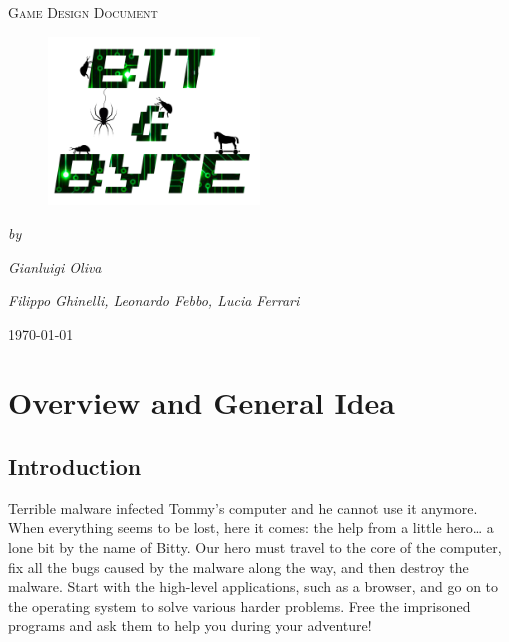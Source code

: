 \documentclass[12pt, a4paper]{report}
\begin{document}
\begin{titlepage}
	\centering
	\vspace{1cm}
	\vspace{1cm}

	{\scshape\Large Game Design Document\par}
	\vspace{0.1cm}
	\begin{figure}[H]
		\centering
		\includegraphics[width=0.5\textwidth]{images/Logo}
	\end{figure}
	\vspace{1cm}
	\vspace{3cm}
	{\Large\itshape by\par}
	{\Large\itshape Gianluigi Oliva\par}
	{\Large\itshape Filippo Ghinelli, Leonardo Febbo, Lucia Ferrari\par}
	\vspace{1.5cm}
	\vfill



	\vfill

	{\large \today\par}
\end{titlepage}

\newpage
\tableofcontents
\newpage

\chapter{Overview and General Idea}
\section*{Introduction}
Terrible malware infected Tommy’s computer and he cannot use it anymore. When everything seems to be lost, here it comes: the help from a little hero… a lone bit by the name of Bitty. Our hero must travel to the core of the computer, fix all the bugs caused by the malware along the way, and then destroy the malware. Start with the high-level applications, such as a browser, and go on to the operating system to solve various harder problems. Free the imprisoned programs and ask them to help you during your adventure!\\
\end{document}
